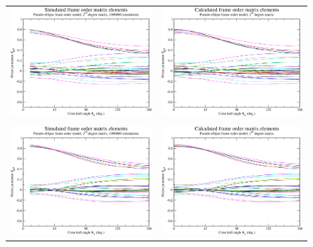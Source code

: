 \begin{figure}
\centering
  \begin{tabular}{@{}cc@{}}
    \includegraphics[width=.5\textwidth]{images/frame_order_matrix/Sijkl_pseudo-ellipse_out_of_frame_theta_x_ens1000000.eps} &
    \includegraphics[width=.5\textwidth]{images/frame_order_matrix/Sijkl_pseudo-ellipse_out_of_frame_theta_x_calc.eps} \\
    \\[-5pt]
    \includegraphics[width=.5\textwidth]{images/frame_order_matrix/Sijkl_pseudo-ellipse_out_of_frame_theta_y_ens1000000.eps} &
    \includegraphics[width=.5\textwidth]{images/frame_order_matrix/Sijkl_pseudo-ellipse_out_of_frame_theta_y_calc.eps} \\

\end{tabular}
\end{figure}
